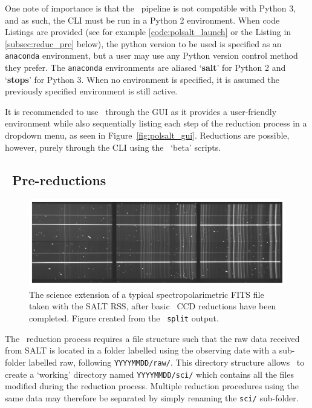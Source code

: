 One note of importance is that the \polsalt\ pipeline is not compatible with Python 3, and as such, the \gls{CLI} must be run in a Python 2 environment. When code Listings are provided (see for example \autoref{code:polsalt_launch} or the Listing in \autoref{subsec:reduc_pre} below), the python version to be used is specified as an \texttt{anaconda} environment, but a user may use any Python version control method they prefer. The \texttt{anaconda} environments are aliased `\textbf{salt}' for Python 2 and `\textbf{stops}' for Python 3. When no environment is specified, it is assumed the previously specified environment is still active.

It is recommended to use \polsalt\ through the \gls{GUI} as it provides a user-friendly environment while also sequentially listing each step of the reduction process in a dropdown menu, as seen in Figure~\ref{fig:polsalt_gui}. Reductions are possible, however, purely through the \gls{CLI} using the \polsalt\ `beta' scripts.

\subsection{\polsalt\ Pre-reductions}\label{subsec:reduc_pre}

\begin{figure}[t]
    \centering
    \includegraphics[width = 1.0\textwidth]{figures/3_pre_wav_cal.pdf}
    \caption{The science extension of a typical spectropolarimetric \acs{FITS} file taken with the \gls{SALT} \gls{RSS}, after basic \polsalt\ \gls{CCD} reductions have been completed. Figure created from the \stops\ \texttt{split} output.}
    \label{fig:polsalt_pre_wav_cal}
\end{figure}

The \polsalt\ reduction process requires a file structure such that the raw data received from \gls{SALT} is located in a folder labelled using the observing date with a sub-folder labelled raw, following \texttt{YYYYMMDD/raw/}. This directory structure allows \polsalt\ to create a `working' directory named \texttt{YYYYMMDD/sci/} which contains all the files modified during the reduction process. Multiple reduction procedures using the same data may therefore be separated by simply renaming the \texttt{sci/} sub-folder.

